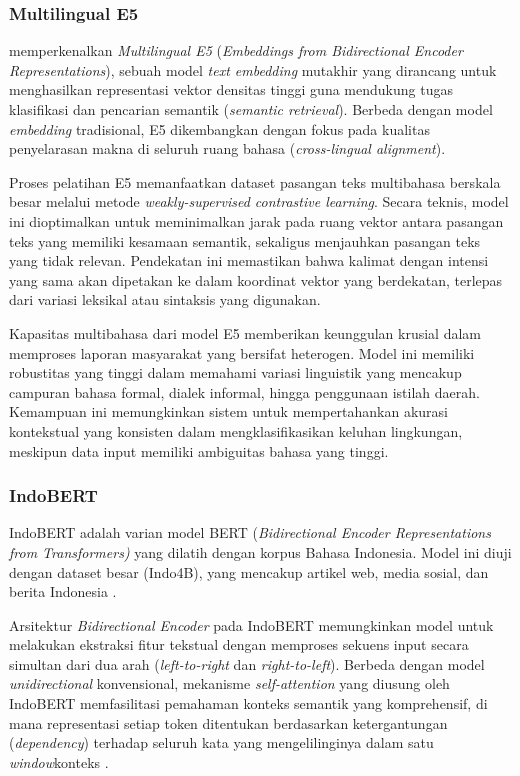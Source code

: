 \subsubsection{Multilingual E5}

\citet{wang2024multilinguale5textembeddings} memperkenalkan \textit{Multilingual E5} (\textit{Embeddings from Bidirectional Encoder Representations}), sebuah model \textit{text embedding} mutakhir yang dirancang untuk menghasilkan representasi vektor densitas tinggi guna mendukung tugas klasifikasi dan pencarian semantik (\textit{semantic retrieval}). Berbeda dengan model \textit{embedding} tradisional, E5 dikembangkan dengan fokus pada kualitas penyelarasan makna di seluruh ruang bahasa (\textit{cross-lingual alignment}).

Proses pelatihan E5 memanfaatkan dataset pasangan teks multibahasa berskala besar melalui metode \textit{weakly-supervised contrastive learning}\citep{wang2024multilinguale5textembeddings}. Secara teknis, model ini dioptimalkan untuk meminimalkan jarak pada ruang vektor antara pasangan teks yang memiliki kesamaan semantik, sekaligus menjauhkan pasangan teks yang tidak relevan. Pendekatan ini memastikan bahwa kalimat dengan intensi yang sama akan dipetakan ke dalam koordinat vektor yang berdekatan, terlepas dari variasi leksikal atau sintaksis yang digunakan.

Kapasitas multibahasa dari model E5 memberikan keunggulan krusial dalam memproses laporan masyarakat yang bersifat heterogen. Model ini memiliki robustitas yang tinggi dalam memahami variasi linguistik yang mencakup campuran bahasa formal, dialek informal, hingga penggunaan istilah daerah. Kemampuan ini memungkinkan sistem untuk mempertahankan akurasi kontekstual yang konsisten dalam mengklasifikasikan keluhan lingkungan, meskipun data input memiliki ambiguitas bahasa yang tinggi.

\subsubsection{ IndoBERT}
IndoBERT adalah varian model BERT (\textit{Bidirectional Encoder Representations from Transformers)} yang dilatih dengan korpus Bahasa Indonesia. Model ini diuji dengan dataset besar (Indo4B), yang mencakup artikel web, media sosial, dan berita Indonesia \citep{koto2020indolemindobertbenchmarkdataset}.


Arsitektur \textit{Bidirectional Encoder} pada IndoBERT memungkinkan model untuk melakukan ekstraksi fitur tekstual dengan memproses sekuens input secara simultan dari dua arah (\textit{left-to-right} dan \textit{right-to-left}). Berbeda dengan model \textit{unidirectional} konvensional, mekanisme \textit{self-attention} yang diusung oleh IndoBERT memfasilitasi pemahaman konteks semantik yang komprehensif, di mana representasi setiap token ditentukan berdasarkan ketergantungan (\textit{dependency}) terhadap seluruh kata yang mengelilinginya dalam satu \textit{window}konteks \citep{wilieIndoNLUBenchmarkResources2020}.

